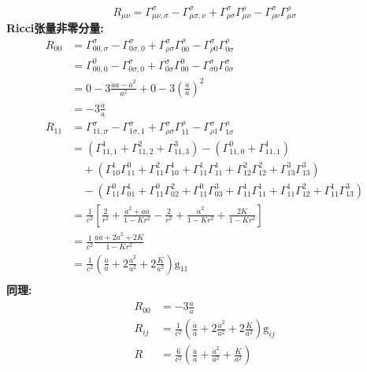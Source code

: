 \documentclass[14pt]{article}
\newcommand{\csg}[2]{\Gamma^{#1}_{#2}}
\newcommand{\csgd}[3]{\Gamma^{#1}_{#2,#3}}
\newcommand{\g}{\mathrm{g}}
\newcommand{\Ricci}[2]{\csgd{\sigma}{#1#2}{\sigma} - \csgd{\sigma}{#1\sigma}{#2} +\csg{\sigma}{\rho \sigma}\csg{\rho}{#1 #2} -\csg{\sigma}{\rho #2}\csg{\rho}{#1\sigma}}
\begin{document}
\[
R_{\mu\nu}  = \Ricci{\mu}{\nu} \tag{1.3.1}
\]
\textbf{Ricci张量非零分量:}
\begin{align*}
R_{00}  &= \Ricci{0}{0}\\
        &= \csg{0}{00,0} -\csg{\sigma}{0\sigma,0}  +\csg{\sigma}{0\sigma} \csg{0}{00} - \csg{\sigma}{\sigma 0} \csg{\sigma}{0\sigma}\\ 
        &= 0-3\frac{\ddot{a}a-\dot{a}^{2}}{a^{2}}+0-3(\frac{\dot{a}}{a})^{2}\\
        &= -3\frac{\ddot{a}}{a}\tag{1.3.2}\\
R_{11}  &= \Ricci{1}{1}\\
        &= (\csg{1}{11,1}+\csg{2}{11,2}+\csg{3}{11,3})-(\csg{0}{11,0}+\csg{1}{11,1})\\
        &\quad +(\csg{1}{10}\csg{0}{11}+\csg{2}{11}\csg{1}{10}+\csg{1}{11}\csg{1}{11}+\csg{2}{12}\csg{2}{12}+\csg{3}{13}\csg{3}{13})\\
        &\quad -(\csg{0}{11}\csg{1}{01}+\csg{0}{11}\csg{2}{02}+\csg{0}{11}\csg{3}{03}+\csg{1}{11}\csg{1}{11}+\csg{1}{11}\csg{2}{12}+\csg{1}{11}\csg{3}{13})\\
        &=\frac{1}{c^{2}}[\frac{2}{r^{2}}+\frac{\dot{a}^{2}+a\ddot{a}}{1-Kr^{2}}-\frac{2}{r^{2}}+\frac{\dot{a}^{2}}{1-Kr^{2}}+\frac{2K}{1-Kr^{2}}]\\
        &=\frac{1}{c^{2}}\frac{a\ddot{a}+2\dot{a}^{2}+2K}{1-Kr^{2}}\\
        &=\frac{1}{c^{2}}(\frac{\ddot{a}}{a}+2\frac{\dot{a}^{2}}{a^{2}}+2\frac{K}{a^{2}})\g_{11}\tag{1.3.3}\\
\end{align*}
\textbf{同理:}
\begin{align*}
R_{00}  &= -3\frac{\ddot{a}}{a}\tag{1.3.4}\\
R_{ij}  &=\frac{1}{c^{2}}(\frac{\ddot{a}}{a}+2\frac{\dot{a}^{2}}{a^{2}}+2\frac{K}{a^{2}})\g_{ij}\tag{1.3.5}\\
R &= \frac{6}{c^{2}}(\frac{\ddot{a}}{a}+\frac{\dot{a}^{2}}{a^{2}}+\frac{K}{a^{2}})\tag{1.3.6}
\end{align*}
\end{document}
